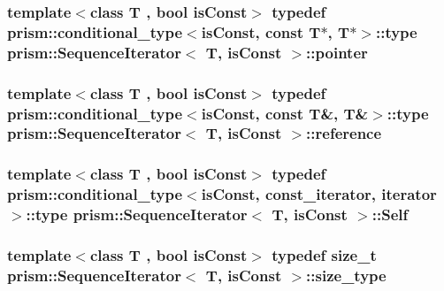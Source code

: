\subsubsection[{\texorpdfstring{pointer}{pointer}}]{\setlength{\rightskip}{0pt plus 5cm}template$<$class T , bool is\+Const$>$ typedef {\bf prism\+::conditional\+\_\+type}$<$is\+Const, const T$\ast$, T$\ast$$>$\+::type {\bf prism\+::\+Sequence\+Iterator}$<$ T, is\+Const $>$\+::{\bf pointer}}\hypertarget{structprism_1_1_sequence_iterator_aba1344ee0e1c4be6658f8a3413c66df2}{}\label{structprism_1_1_sequence_iterator_aba1344ee0e1c4be6658f8a3413c66df2}
\subsubsection[{\texorpdfstring{reference}{reference}}]{\setlength{\rightskip}{0pt plus 5cm}template$<$class T , bool is\+Const$>$ typedef {\bf prism\+::conditional\+\_\+type}$<$is\+Const, const T\&, T\&$>$\+::type {\bf prism\+::\+Sequence\+Iterator}$<$ T, is\+Const $>$\+::{\bf reference}}\hypertarget{structprism_1_1_sequence_iterator_ac93bc1c2e901ea09aba9c3af33da21ba}{}\label{structprism_1_1_sequence_iterator_ac93bc1c2e901ea09aba9c3af33da21ba}
\subsubsection[{\texorpdfstring{Self}{Self}}]{\setlength{\rightskip}{0pt plus 5cm}template$<$class T , bool is\+Const$>$ typedef {\bf prism\+::conditional\+\_\+type}$<$is\+Const, {\bf const\+\_\+iterator}, {\bf iterator}$>$\+::type {\bf prism\+::\+Sequence\+Iterator}$<$ T, is\+Const $>$\+::{\bf Self}}\hypertarget{structprism_1_1_sequence_iterator_ab79c94ff5b3328808b659f19d6bc0301}{}\label{structprism_1_1_sequence_iterator_ab79c94ff5b3328808b659f19d6bc0301}
\subsubsection[{\texorpdfstring{size\+\_\+type}{size_type}}]{\setlength{\rightskip}{0pt plus 5cm}template$<$class T , bool is\+Const$>$ typedef size\+\_\+t {\bf prism\+::\+Sequence\+Iterator}$<$ T, is\+Const $>$\+::{\bf size\+\_\+type}}\hypertarget{structprism_1_1_sequence_iterator_a5a9c57ebdda1cd8eb2e4b3ddbd627fcf}{}\label{structprism_1_1_sequence_iterator_a5a9c57ebdda1cd8eb2e4b3ddbd627fcf}
